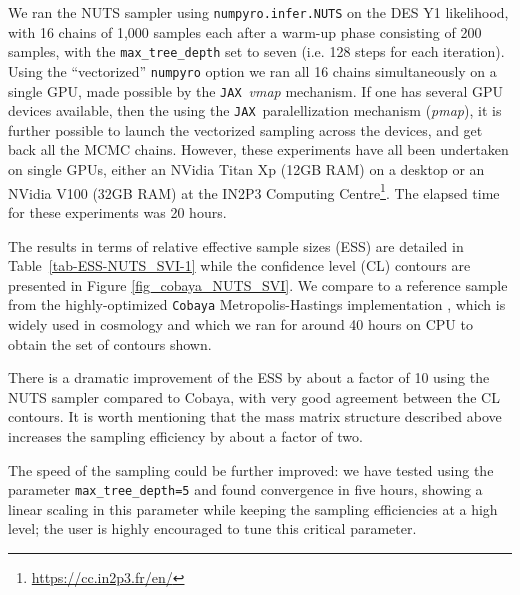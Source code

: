 \documentclass[twocolumn,twocolappendix,nofootinbib,iop]{openjournal}
\newcommand{\FrL}[1]{{\color{cyan}FL: #1}}
\newcommand{\jax}{\texttt{JAX}}
\begin{document}


We ran the NUTS sampler using \texttt{numpyro.infer.NUTS} on the DES Y1 likelihood,  with 16 chains of 1,000 samples each after a warm-up phase consisting of 200 samples, with the \texttt{max\_tree\_depth} set to seven (i.e. 128 steps for each iteration). %
Using the ``vectorized'' \texttt{numpyro} option we ran all 16 chains simultaneously on a single GPU, made possible by the \jax\ \textit{vmap} mechanism. If one has several GPU devices available, then the using the \jax\ paralellization mechanism (\textit{pmap}), it is further possible to launch the vectorized sampling across the devices, and get back all the MCMC chains. However, these experiments have all been undertaken on single GPUs, either an NVidia Titan Xp (12GB RAM) on a desktop or an NVidia V100 (32GB RAM) at the IN2P3 Computing Centre\footnote{\url{https://cc.in2p3.fr/en/}}. The elapsed time for these experiments was 20 hours.

The results in terms of relative effective sample sizes (ESS) are detailed in Table~\ref{tab-ESS-NUTS_SVI-1} while the confidence level (CL) contours are presented in Figure \ref{fig_cobaya_NUTS_SVI}. We compare to a reference sample from the highly-optimized \texttt{Cobaya} Metropolis-Hastings implementation \citep{2019ascl.soft10019T,2021JCAP...05..057T}, which is widely used in cosmology and which we ran for around 40 hours on CPU to obtain the set of contours shown.

There is a dramatic improvement of the ESS by about a factor of 10 using the NUTS sampler compared to Cobaya, with very good agreement between the CL contours. It is worth mentioning that the mass matrix structure described above increases the sampling efficiency by about a factor of two.

The speed of the sampling could be further improved: we have tested using the parameter \texttt{max\_tree\_depth=5} and found convergence in five hours, showing a linear scaling in this parameter while keeping the sampling efficiencies at a high level; the user is highly encouraged to tune this critical parameter. 
\end{document}
